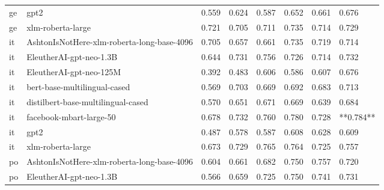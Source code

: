 \begin{tabular}{llllllll}
      ge &                                       gpt2 & 0.559 &                     0.624 &                 0.587 &                  0.652 &                                   0.661 &     0.676 \\
      ge &                          xlm-roberta-large & 0.721 &                     0.705 &                 0.711 &                  0.735 &                                   0.714 &     0.729 \\
      it & AshtonIsNotHere-xlm-roberta-long-base-4096 & 0.705 &                     0.657 &                 0.661 &                  0.735 &                                   0.719 &     0.714 \\
      it &                    EleutherAI-gpt-neo-1.3B & 0.644 &                     0.731 &                 0.756 &                  0.726 &                                   0.714 &     0.732 \\
      it &                    EleutherAI-gpt-neo-125M & 0.392 &                     0.483 &                 0.606 &                  0.586 &                                   0.607 &     0.676 \\
      it &               bert-base-multilingual-cased & 0.569 &                     0.703 &                 0.669 &                  0.692 &                                   0.683 &     0.713 \\
      it &         distilbert-base-multilingual-cased & 0.570 &                     0.651 &                 0.671 &                  0.669 &                                   0.639 &     0.684 \\
      it &                    facebook-mbart-large-50 & 0.678 &                     0.732 &                 0.760 &                  0.780 &                                   0.728 & **0.784** \\
      it &                                       gpt2 & 0.487 &                     0.578 &                 0.587 &                  0.608 &                                   0.628 &     0.609 \\
      it &                          xlm-roberta-large & 0.673 &                     0.729 &                 0.765 &                  0.764 &                                   0.725 &     0.757 \\
      po & AshtonIsNotHere-xlm-roberta-long-base-4096 & 0.604 &                     0.661 &                 0.682 &                  0.750 &                                   0.757 &     0.720 \\
      po &                    EleutherAI-gpt-neo-1.3B & 0.566 &                     0.659 &                 0.725 &                  0.750 &                                   0.741 &     0.731 \\

\end{tabular}
